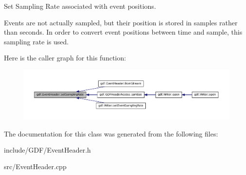 Set Sampling Rate associated with event positions. 

Events are not actually sampled, but their position is stored in samples rather than seconds. In order to convert event positions between time and sample, this sampling rate is used. 

Here is the caller graph for this function:
\nopagebreak
\begin{figure}[H]
\begin{center}
\leavevmode
\includegraphics[width=400pt]{classgdf_1_1_event_header_a2be9223eaf498c7d71ab0018205062b6_icgraph}
\end{center}
\end{figure}




The documentation for this class was generated from the following files:\begin{DoxyCompactItemize}
\item 
include/GDF/EventHeader.h\item 
src/EventHeader.cpp\end{DoxyCompactItemize}
